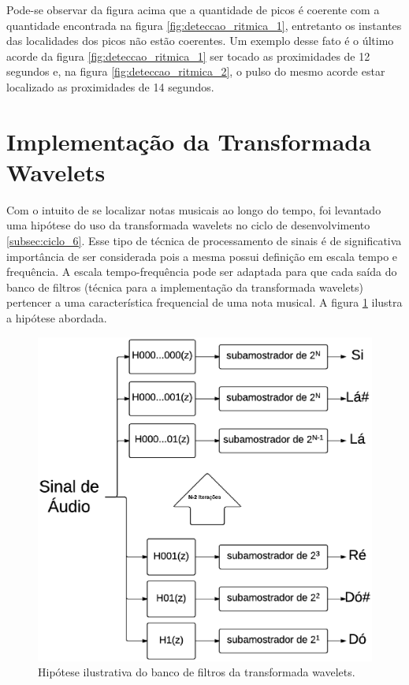 Pode-se observar da figura acima que a quantidade de picos é coerente com a quantidade encontrada na figura \ref{fig:deteccao_ritmica_1}, entretanto os instantes das localidades dos picos não estão coerentes. Um exemplo desse fato é o último acorde da figura \ref{fig:deteccao_ritmica_1} ser tocado as proximidades de 12 segundos e, na figura \ref{fig:deteccao_ritmica_2}, o pulso do mesmo acorde estar localizado as proximidades de 14 segundos.

\section{Implementação da Transformada Wavelets}
Com o intuito de se localizar notas musicais ao longo do tempo, foi levantado uma hipótese do uso da transformada wavelets no ciclo de desenvolvimento \ref{subsec:ciclo_6}. Esse tipo de técnica de processamento de sinais é de significativa importância de ser considerada pois a mesma possui definição em escala tempo e frequência. A escala tempo-frequência pode ser adaptada para que cada saída do banco de filtros (técnica para a implementação da transformada wavelets) pertencer a uma característica frequencial de uma nota musical. A figura \ref{fig:banco_de_filtros} ilustra a hipótese abordada.

\begin{figure}[h]
    \centering
    \includegraphics[keepaspectratio=true,scale=0.7]{figuras/wavelet_figura.eps}
  \caption{Hipótese ilustrativa do banco de filtros da transformada wavelets.}
  \label{fig:banco_de_filtros}
\end{figure}

